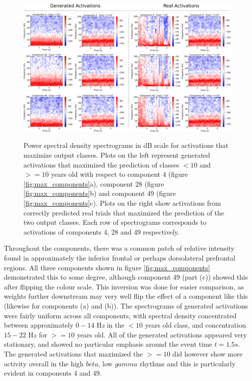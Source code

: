 \documentclass[fleqn,10pt]{wlscirep}
\begin{document}
\begin{figure}[ht]
  \caption{Power spectral density spectrograms in dB scale for activations that maximize output classes. Plots on the left represent generated activations that maximized the prediction of classes $<10$ and $>=10$ years old with respect to component 4 (figure \ref{fig:max_components}a), component 28 (figure \ref{fig:max_components}b) and component 49 (figure \ref{fig:max_components}c). Plots on the right show activations from correctly predicted real trials that maximized the prediction of the two output classes. Each row of spectrograms corresponds to activations of components 4, 28 and 49 respectively.}
  \centering\includegraphics[width=\linewidth]{Spectrograms.pdf}
 \label{fig:max_spectrograms}
\end{figure}

Throughout the components, there was a common patch of relative intensity found in approximately the inferior frontal or perhaps dorsolateral prefrontal regions. All three components shown in figure \ref{fig:max_components} demonstrated this to some degree, although component 49 (part (c)) showed this after flipping the colour scale. This inversion was done for easier comparison, as weights further downstream may very well flip the effect of a component like this (likewise for components (a) and (b)). The spectrograms of generated activations were fairly uniform across all components, with spectral density concentrated between approximately $0-14$ H{\em z} in the $<10$ years old class, and concentration $15-22$ H$z$ for $>=10$ years old. All of the generated activations appeared very stationary, and showed no particular emphasis around the event time $t=1.5s$. The generated activations that maximized the $>=10$ did however show more activity overall in the high $beta$, low $gamma$ rhythms and this is particularly evident in components 4 and 49.
\end{document}
